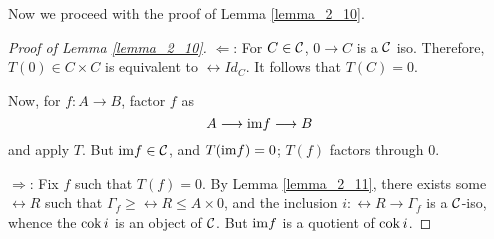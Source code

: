 Now we proceed with the proof of Lemma \ref{lemma_2_10}.

\begin{proof}[Proof of Lemma \ref{lemma_2_10}]
\noindent $\Leftarrow$: For $C \in \mathcal{C}$, $0 \to C$ is
a $\mathcal{C}$ iso. Therefore, $T(0) \in C \times C$ is
equivalent to $\rel{Id}_C$. It follows that $T(C) = 0$.

Now, for $f: A \to B$, factor $f$ as
\[
A \longrightarrow \mathrm{im} f \longrightarrow B
\]
and apply $T$. But $\mathrm{im} f \in \mathcal{C}$, and $T(\mathrm{im} f) = 0$; 
$T(f)$ factors through $0$.

\noindent $\Rightarrow$: Fix $f$ such that $T(f) = 0$. By Lemma 
\ref{lemma_2_11}, there exists some $\rel{R}$ such that 
$\Gamma_f \geq \rel{R} \leq A \times 0$, and the inclusion $i: 
\rel{R} \to \Gamma_f$ is a $\mathcal{C}$-iso, whence the $\mathrm{cok}\, i$ is 
an object of $\mathcal{C}$. But $\mathrm{im} f$ is a quotient of $\mathrm{cok}\, i$.
\end{proof}
